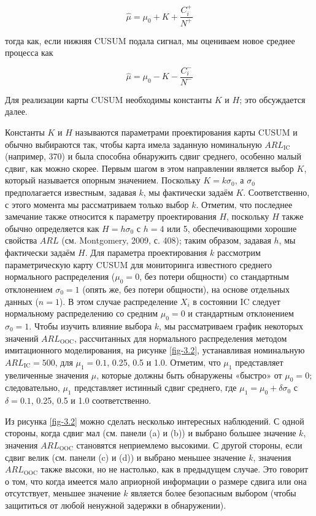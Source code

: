 \begin{equation}
	\hat{\mu} = \mu_0 + K + \frac{C_i^+}{N^+}
	\label{eq:3.6}
\end{equation}

тогда как, если нижняя CUSUM подала сигнал, мы оцениваем новое среднее процесса как

\begin{equation}
	\hat{\mu} = \mu_0 - K - \frac{C_i^-}{N^-}
	\label{eq:3.7}
\end{equation}

Для реализации карты CUSUM необходимы константы \(K\) и \(H\); это обсуждается далее.

Константы \(K\) и \(H\) называются параметрами проектирования карты CUSUM и обычно выбираются так, чтобы карта имела заданную номинальную \(ARL_{\text{IC}}\) (например, 370) и была способна обнаружить сдвиг среднего, особенно малый сдвиг, как можно скорее. Первым шагом в этом направлении является выбор \(K\), который называется опорным значением. Поскольку \(K = k\sigma_0\), а \(\sigma_0\) предполагается известным, задавая \(k\), мы фактически задаём \(K\). Соответственно, с этого момента мы рассматриваем только выбор \(k\). Отметим, что последнее замечание также относится к параметру проектирования \(H\), поскольку \(H\) также обычно определяется как \(H = h\sigma_0\) с \(h = 4\) или 5, обеспечивающими хорошие свойства \(ARL\) (см. Montgomery, 2009, с. 408); таким образом, задавая \(h\), мы фактически задаём \(H\). Для параметра проектирования \(k\) рассмотрим параметрическую карту CUSUM для мониторинга известного среднего нормального распределения (\(\mu_0 = 0\), без потери общности) со стандартным отклонением \(\sigma_0 = 1\) (опять же, без потери общности), на основе отдельных данных (\(n = 1\)). В этом случае распределение \(X_i\) в состоянии IC следует нормальному распределению со средним \(\mu_0 = 0\) и стандартным отклонением \(\sigma_0 = 1\). Чтобы изучить влияние выбора \(k\), мы рассматриваем график некоторых значений \(ARL_{\text{OOC}}\), рассчитанных для нормального распределения методом имитационного моделирования, на рисунке \ref{fig-3.2}, устанавливая номинальную \(ARL_{\text{IC}} = 500\), для \(\mu_1 = 0.1\), 0.25, 0.5 и 1.0. Отметим, что \(\mu_1\) представляет увеличенные значения \(\mu\), которые должны быть обнаружены «быстро» от \(\mu_0 = 0\); следовательно, \(\mu_1\) представляет истинный сдвиг среднего, где \(\mu_1 = \mu_0 + \delta\sigma_0\) с \(\delta = 0.1\), 0.25, 0.5 и 1.0 соответственно.

Из рисунка \ref{fig-3.2} можно сделать несколько интересных наблюдений. С одной стороны, когда сдвиг мал (см. панели (a) и (b)) и выбрано большее значение \(k\), значения \(ARL_{\text{OOC}}\) становятся неприемлемо высокими. С другой стороны, если сдвиг велик (см. панели (c) и (d)) и выбрано меньшее значение \(k\), значения \(ARL_{\text{OOC}}\) также высоки, но не настолько, как в предыдущем случае. Это говорит о том, что когда имеется мало априорной информации о размере сдвига или она отсутствует, меньшее значение \(k\) является более безопасным выбором (чтобы защититься от любой ненужной задержки в обнаружении).

